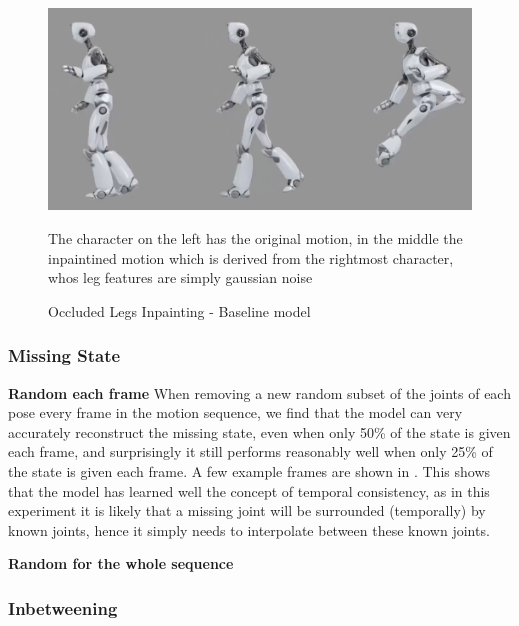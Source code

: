 \begin{figure}[!ht]
    \centering
    \includegraphics[width=1\textwidth]{Figures/diffusion/results/basline_inpainting_legs.png}
    \caption{Occluded Legs Inpainting - Baseline model}
    \label{fig:baseline_occluded_legs}
    \medskip
    \small
    The character on the left has the original motion, in the middle the inpaintined motion which is derived from the rightmost character, whos leg features are simply gaussian noise
\end{figure}


\subsubsection{Missing State}
\textbf{Random each frame}
When removing a new random subset of the joints of each pose every frame in the motion sequence, we find that the model can very accurately reconstruct the missing state, even when only 50\% of the state is given each frame, and surprisingly it still performs reasonably well when only 25\% of the state is given each frame. A few example frames are shown in . This shows that the model has learned well the concept of temporal consistency, as in this experiment it is likely that a missing joint will be surrounded (temporally) by known joints, hence it simply needs to interpolate between these known joints.


\textbf{Random for the whole sequence}


\subsubsection{Inbetweening}



